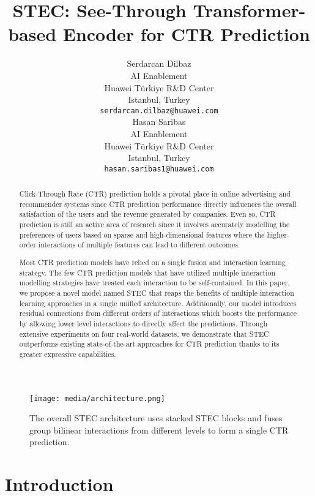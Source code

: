 \documentclass{article}
\title{STEC: See-Through Transformer-based Encoder for CTR Prediction
}
\author{
 Serdarcan Dilbaz \\
  AI Enablement\\
  Huawei Türkiye R\&D Center\\
  Istanbul, Turkey \\
  \texttt{serdarcan.dilbaz@huawei.com} \\
   \And
 Hasan Saribas \\
  AI Enablement\\
  Huawei Türkiye R\&D Center\\
  Istanbul, Turkey \\
  \texttt{hasan.saribas1@huawei.com}
}
\begin{document}
\maketitle

\begin{abstract}
Click-Through Rate (CTR) prediction holds a pivotal place in online advertising and recommender systems since CTR prediction performance directly influences the overall satisfaction of the users and the revenue generated by companies. Even so, CTR prediction is still an active area of research since it involves accurately modelling the preferences of users based on sparse and high-dimensional features where the higher-order interactions of multiple features can lead to different outcomes.

Most CTR prediction models have relied on a single fusion and interaction learning strategy. The few CTR prediction models that have utilized multiple interaction modelling strategies have treated each interaction to be self-contained. In this paper, we propose a novel model named STEC that reaps the benefits of multiple interaction learning approaches in a single unified architecture. Additionally, our model introduces residual connections from different orders of interactions which boosts the performance by allowing lower level interactions to directly affect the predictions. Through extensive experiments on four real-world datasets, we demonstrate that STEC outperforms existing state-of-the-art approaches for CTR prediction thanks to its greater expressive capabilities.
\end{abstract}


\begin{figure}[t]
\centering
\texttt{[image: media/architecture.png]}
\caption{The overall STEC architecture uses  stacked STEC blocks and fuses  group bilinear interactions from different levels to form a single CTR prediction.}
\label{fig:architecture}
\end{figure}


\section{Introduction}
\end{document}
